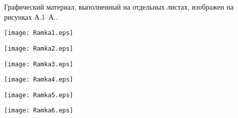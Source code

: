 
Графический материал, выполненный на отдельных листах,
изображен на рисунках А.1--А..
\setcounter{числоПлакатов}{0}

\renewcommand{\thefigure}{А.\arabic{figure}} %

\begin{landscape}

\begin{плакат}
    \texttt{[image: Ramka1.eps]}
    \label{pl1:image}      
\end{плакат}

\begin{плакат}
    \texttt{[image: Ramka2.eps]}
    \label{pl2:image}      
\end{плакат}

\begin{плакат}
    \texttt{[image: Ramka3.eps]}
    \label{pl3:image}      
\end{плакат}

\begin{плакат}
    \texttt{[image: Ramka4.eps]}
    \label{pl4:image}      
\end{плакат}

\begin{плакат}
	\texttt{[image: Ramka5.eps]}
	\label{pl5:image}      
\end{плакат}

\begin{плакат}
	\texttt{[image: Ramka6.eps]}
	\label{pl6:image}      
\end{плакат}

\end{landscape}
